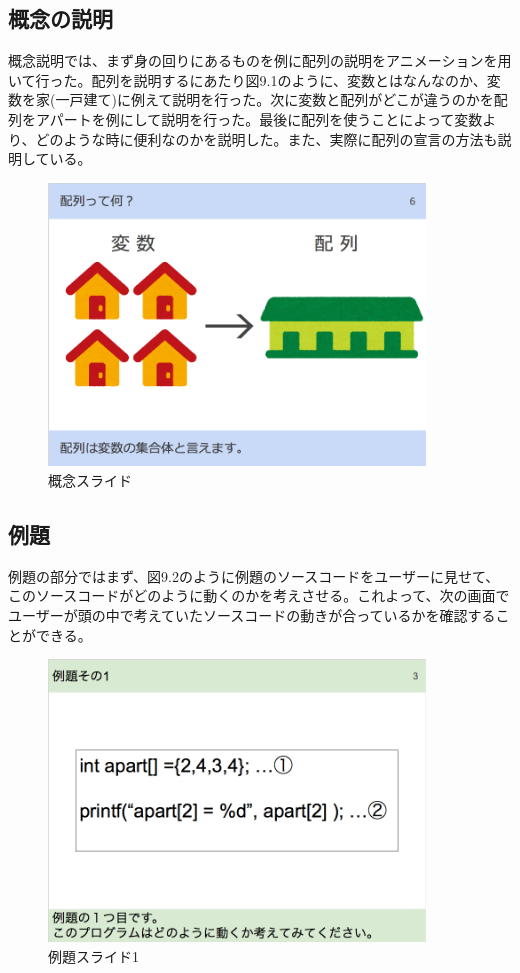 \documentclass[openany,11pt,papersize]{jsbook}
\begin{document}
\subsection{概念の説明}
概念説明では、まず身の回りにあるものを例に配列の説明をアニメーションを用いて行った。配列を説明するにあたり図9.1のように、変数とはなんなのか、変数を家(一戸建て)に例えて説明を行った。次に変数と配列がどこが違うのかを配列をアパートを例にして説明を行った。最後に配列を使うことによって変数より、どのような時に便利なのかを説明した。また、実際に配列の宣言の方法も説明している。
\begin{figure}[H]
\begin{center}
\includegraphics[width=10cm, bb=0 0 850 638]{img/9thParagraph/gainen_01.png}
\end{center}
\caption{概念スライド}
\end{figure}


\subsection{例題}
例題の部分ではまず、図9.2のように例題のソースコードをユーザーに見せて、このソースコードがどのように動くのかを考えさせる。これよって、次の画面でユーザーが頭の中で考えていたソースコードの動きが合っているかを確認することができる。

\begin{figure}[H]
\begin{center}
\includegraphics[width=10cm, bb=0 0 852 638]{img/9thParagraph/reidai_01.png}
\end{center}
\caption{例題スライド1}
\end{figure}
\end{document}
